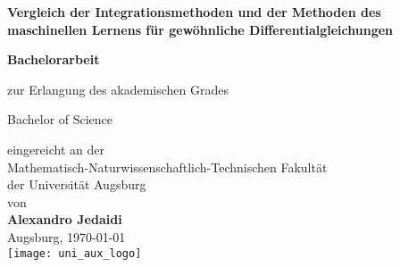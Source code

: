 \begin{titlepage}
    \begin{center}
        \Large
        {\Huge
        \textbf{Vergleich der Integrationsmethoden und der Methoden des maschinellen Lernens für gewöhnliche
        Differentialgleichungen}}

        \vspace*{1cm}

        \textbf{Bachelorarbeit}\\

        \vspace{0.5cm}

        zur Erlangung des akademischen Grades\\

        \vspace{0.25cm}

        Bachelor of Science\\

        \vspace{1cm}

        eingereicht an der \\
        Mathematisch-Naturwissenschaftlich-Technischen Fakultät\\
        der Universität Augsburg\\

        \vspace{1cm}
        von\\
        \textbf{Alexandro Jedaidi}\\
        \vspace{1.5cm}
        Augsburg, \today \\
        \vspace{0.5cm}
        \texttt{[image: uni\_aux\_logo]}
    \end{center}
\end{titlepage}
